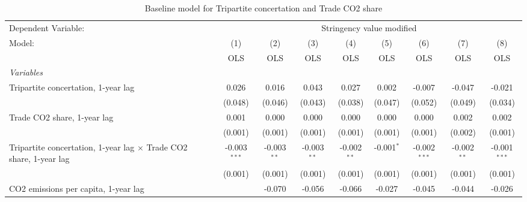 
\begin{table}[htbp]
   \caption{Baseline model for Tripartite concertation and Trade CO2 share}
   \centering
   \begin{tabular}{lcccccccc}
      \toprule
      Dependent Variable: & \multicolumn{8}{c}{Stringency value modified}\\
      Model:                                                                    & (1)            & (2)           & (3)           & (4)           & (5)           & (6)            & (7)           & (8)\\  
                                                                                &  OLS           & OLS           & OLS           & OLS           & OLS           & OLS            & OLS           & OLS\\  
      \midrule
      \emph{Variables}\\
      Tripartite concertation, 1-year lag                                       & 0.026          & 0.016         & 0.043         & 0.027         & 0.002         & -0.007         & -0.047        & -0.021\\   
                                                                                & (0.048)        & (0.046)       & (0.043)       & (0.038)       & (0.047)       & (0.052)        & (0.049)       & (0.034)\\   
      Trade CO2 share, 1-year lag                                               & 0.001          & 0.000         & 0.000         & 0.000         & 0.000         & 0.000          & 0.002         & 0.002\\   
                                                                                & (0.001)        & (0.001)       & (0.001)       & (0.001)       & (0.001)       & (0.001)        & (0.002)       & (0.001)\\   
      Tripartite concertation, 1-year lag $\times$ Trade CO2 share, 1-year lag  & -0.003$^{***}$ & -0.003$^{**}$ & -0.003$^{**}$ & -0.002$^{**}$ & -0.001$^{*}$  & -0.002$^{***}$ & -0.002$^{**}$ & -0.001$^{***}$\\   
                                                                                & (0.001)        & (0.001)       & (0.001)       & (0.001)       & (0.001)       & (0.001)        & (0.001)       & (0.001)\\   
      CO2 emissions per capita, 1-year lag                                      &                & -0.070        & -0.056        & -0.066        & -0.027        & -0.045         & -0.044        & -0.026\\   

\end{tabular}
\end{table}
